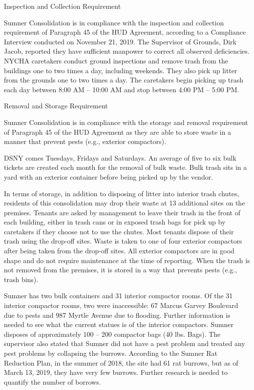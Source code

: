 


Inspection and Collection Requirement

Sumner Consolidation is in compliance with the inspection and collection requirement of  Paragraph 45 of the HUD Agreement, according to a Compliance Interview conducted on November 21, 2019. The Supervisor of Grounds, Dirk Jacob, reported they have sufficient manpower to correct all observed deficiencies. NYCHA caretakers conduct ground inspections and remove trash from the buildings one to two times a day, including weekends. They also pick up litter from the grounds one to two times a day. The caretakers begin picking up trash each day between 8:00 AM -- 10:00 AM and stop between 4:00 PM -- 5:00 PM. 



Removal and Storage Requirement

Sumner Consolidation is in compliance with the storage and removal requirement of Paragraph 45 of the HUD Agreement as they are able to store waste in a manner that prevent pests (e.g., exterior compactors).

 

DSNY comes Tuesdays, Fridays and Saturdays. An average of five to six bulk tickets are created each month for the removal of bulk waste. Bulk trash sits in a yard with an exterior container before being picked up by the vendor.



In terms of storage, in addition to disposing of litter into interior trash chutes, residents of this consolidation may drop their waste at 13 additional sites on the premises. Tenants are asked by management to leave their trash in the front of each building, either in trash cans or in exposed trash bags for pick up by caretakers if they choose not to use the chutes. Most tenants dispose of their trash using the drop-off sites. Waste is taken to one of four exterior compactors after being taken from the drop-off sites. All exterior compactors are in good shape and do not require maintenance at the time of reporting. When the trash is not removed from the premises, it is stored in a way that prevents pests (e.g., trash bins).



Sumner has two bulk containers and 31 interior compactor rooms. Of the 31 interior compactor rooms, two were inaccessible: 67 Marcus Garvey Boulevard due to pests and 987 Myrtle Avenue due to flooding. Further information is needed to see what the current statues is of the interior compactors. Sumner disposes of approximately 100 -- 200 compactor bags (40 lbs. Bags). The supervisor also stated that Sumner did not have a pest problem and treated any pest problems by collapsing the burrows. According to the Sumner Rat Reduction Plan, in the summer of 2018, the site had 61 rat burrows, but as of March 13, 2019, they have very few burrows. Further research is needed to quantify the number of borrows.



